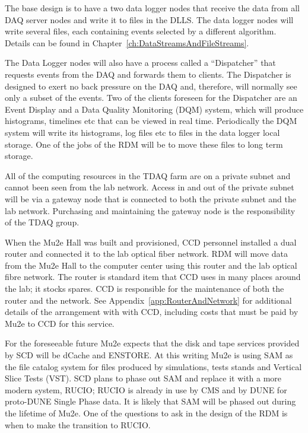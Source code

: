 The base design is to have a two data logger nodes that receive the data from all DAQ server nodes
and write it to files in the DLLS.
The data logger nodes will write several files, each containing events selected by a different algorithm.
Details can be found in Chapter~\ref{ch:DataStreamsAndFileStreams}.

The Data Logger nodes will also have a process called a ``Dispatcher''
that requests events from the DAQ and forwards them to clients.
The Dispatcher is designed to exert no back pressure on the DAQ
and, therefore, will normally see only a subset of the events.
Two of the clients foreseen for the Dispatcher are an Event Display and
a Data Quality Monitoring (DQM) system,
which will produce histograms, timelines etc that can be viewed in real time.
Periodically the DQM system will write its histograms, log files etc to
files in the data logger local storage.  One of the jobs of the RDM will be
to move these files to long term storage.

All of the computing resources in the TDAQ farm are on a private subnet
and cannot been seen from the lab network.  Access in and out
of the private subnet will be via a gateway node that is connected to
both the private subnet and the lab network.
Purchasing and maintaining the gateway node is the responsibility of the TDAQ group.

When the Mu2e Hall was built and provisioned, CCD personnel installed a dual router
and connected it to the lab optical fiber network.
RDM will move data from the Mu2e Hall
to the computer center using this router and the lab optical fibre network.
The router is standard item that CCD uses in many places around the lab; it stocks spares.
CCD is responsible for the maintenance of both the router and the network.
See Appendix~\ref{app:RouterAndNetwork} for additional details of the arrangement with with CCD,
including costs that must be paid by Mu2e to CCD for this service.


For the foreseeable future Mu2e expects that the disk and tape services provided
by SCD will be dCache and ENSTORE.
At this writing Mu2e is using SAM as the file catalog system for files produced
by simulations, tests stands and Vertical Slice Tests (VST).
SCD plans to phase out SAM and replace it with a more modern system, RUCIO;
RUCIO is already in use by CMS and by DUNE for proto-DUNE Single Phase data.
It is likely that SAM will be phased out during the lifetime of Mu2e.
One of the questions to ask in the design of the RDM is
when to make the transition to RUCIO.


